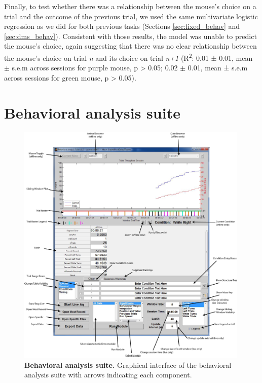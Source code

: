 \bigskip
Finally, to test whether there was a relationship between the mouse’s choice on a trial and the outcome of the previous trial, we used the same multivariate logistic regression as we did for both previous tasks (Sections \ref{sec:fixed_behav} and \ref{sec:dms_behav}). Consistent with those results, the model was unable to predict the mouse’s choice, again suggesting that there was no clear relationship between the mouse’s choice on trial \textit{n} and its choice on trial \textit{n+1} (R\textsuperscript{2}: 0.01 ± 0.01, mean $\pm$ s.e.m across sessions for purple mouse, p > 0.05; 0.02 $\pm$ 0.01, mean ± s.e.m across sessions for green mouse, p > 0.05). 

\section{Behavioral analysis suite}

\begin{figure}
\includegraphics[width=0.99\textwidth,center]{figures/fig_2_10.png}
\caption[Behavioral analysis suite.]{
\textbf{Behavioral analysis suite.} Graphical interface of the behavioral analysis suite with arrows indicating each component.
\label{fig:2_10}}
\end{figure}

